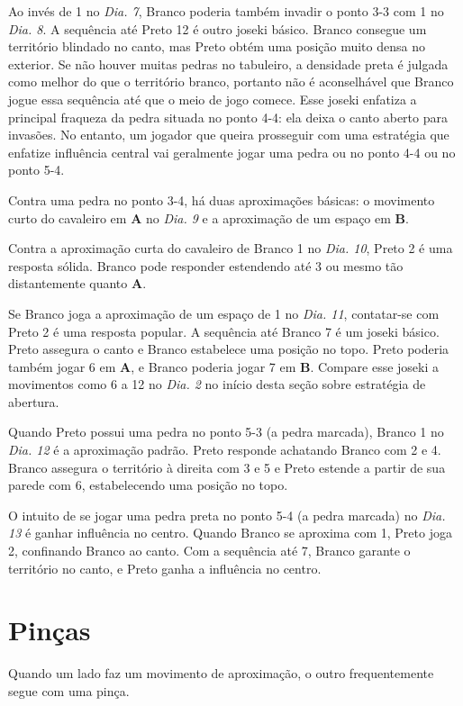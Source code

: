 Ao invés de 1 no \emph{Dia. 7}, Branco poderia também invadir o ponto 3-3 com 1 no \emph{Dia. 8}. A sequência até Preto 12 é outro joseki básico. Branco consegue um território blindado no canto, mas Preto obtém uma posição muito densa no exterior. Se não houver muitas pedras no tabuleiro, a densidade preta é julgada como melhor do que o território branco, portanto não é aconselhável que Branco jogue essa sequência até que o meio de jogo comece. Esse joseki enfatiza a principal fraqueza da pedra situada no ponto 4-4: ela deixa o canto aberto para invasões. No entanto, um jogador que queira prosseguir com uma estratégia que enfatize influência central vai geralmente jogar uma pedra ou no ponto 4-4 ou no ponto 5-4.

Contra uma pedra no ponto 3-4, há duas aproximações básicas: o movimento curto do cavaleiro em \textbf{A} no \emph{Dia. 9} e a aproximação de um espaço em \textbf{B}.

Contra a aproximação curta do cavaleiro de Branco 1 no \emph{Dia. 10}, Preto 2 é uma resposta sólida. Branco pode responder estendendo até 3 ou mesmo tão distantemente quanto \textbf{A}.

Se Branco joga a aproximação de um espaço de 1 no \emph{Dia. 11}, contatar-se com Preto 2 é uma resposta popular. A sequência até Branco 7 é um joseki básico. Preto assegura o canto e Branco estabelece uma posição no topo. Preto poderia também jogar 6 em \textbf{A}, e Branco poderia jogar 7 em \textbf{B}. Compare esse joseki a movimentos como 6 a 12 no \emph{Dia. 2} no início desta seção sobre estratégia de abertura.

Quando Preto possui uma pedra no ponto 5-3 (a pedra marcada), Branco 1 no \emph{Dia. 12} é a aproximação padrão. Preto responde achatando Branco com 2 e 4. Branco assegura o território à direita com 3 e 5 e Preto estende a partir de sua parede com 6, estabelecendo uma posição no topo.

O intuito de se jogar uma pedra preta no ponto 5-4 (a pedra marcada) no \emph{Dia. 13} é ganhar influência no centro. Quando Branco se aproxima com 1, Preto joga 2, confinando Branco ao canto. Com a sequência até 7, Branco garante o território no canto, e Preto ganha a influência no centro.

\section{Pinças}

Quando um lado faz um movimento de aproximação, o outro frequentemente segue com uma pinça.

